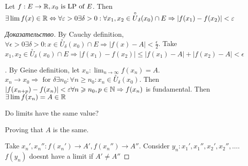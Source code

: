 \begin{theorem}
	Let $f: E \to \mathbb{R}, x_0 \text{ is LP of } E$. Then $\exists \lim f(x) \in \mathbb{R} \Leftrightarrow \forall \varepsilon > 0 \exists \delta > 0: \forall x_1, x_2 \in \overset{\circ} U_\delta (x_0) \cap E \Rightarrow \left| f(x_1) - f(x_2) \right| < \varepsilon$
\end{theorem}
\begin{proof}[Доказательство]
	\fbox{$ \Rightarrow $} By Cauchy definition, $\forall \epsilon > 0 \exists \delta > 0: x \in \overset{\circ} U_\delta (x_0) \cap E \Rightarrow \left| f(x) - A \right| < \frac{\epsilon}{2}$. Take $x_1, x_2 \in \overset{\circ} U_\delta (x_0) \cap E \Rightarrow \left| f(x_1) - f(x_2) \right| \leq \left| f(x_1) - A \right| + \left| f(x_2) - A \right| < \epsilon$

\fbox{$ \Leftarrow $}. By Geine definition, let $x_n: \lim_{n \to \infty} f(x_n) = A$. $x_n \to x_0 \Rightarrow \text{ for } \delta \exists n_0: \forall n \geq n_0: x_n \in \overset{\circ} U_\delta (x_0)$. Then $\left| f(x_{n+p}) - f(x_n) \right| < \varepsilon \forall n \geqslant n_0, p \in \mathbb{N} \Rightarrow f(x_n) $ is fundamental. Then $\exists \lim f(x_n) = A \in \mathbb{R}$

\begin{problem}
	Do limits have the same value?
\end{problem}

Proving that $ A$ is the same.

Take $x_n', x_n'': f(x_n') \to A', f(x_n'') \to A''$. Consider $y_n: x_1', x_1'', x_2', x_2'', \dots $. $f(y_n)$ doesnt have a limit if $A' \neq A''$ 
\end{proof}
